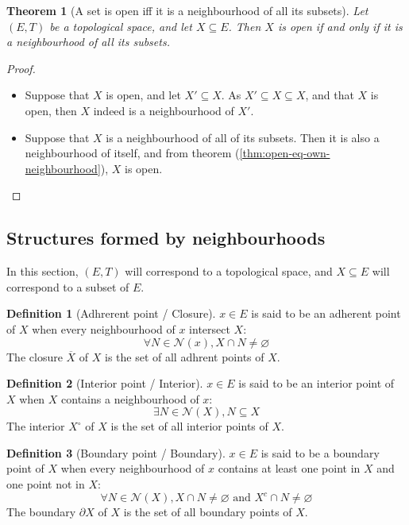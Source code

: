\documentclass{article}
\newtheorem{theorem}{Theorem}[section]
\theoremstyle{definition}
\newtheorem{definition}{Definition}[section]
\theoremstyle{remark}
\theoremstyle{example}
\theoremstyle{notation}
\newcommand{\inter}[1]{{{#1}^\circ}}
\newcommand{\tand}{\text{ and }}
\begin{document}
\begin{theorem}[A set is open iff it is a neighbourhood of all its subsets] \label{thm:open-eq-neighbourhood}
		Let $(E, T)$ be a topological space, and let $X \subseteq E$. Then $X$ is open if and only if it is a neighbourhood of all its subsets.
\end{theorem}

\begin{proof}~
	\begin{itemize}
		\item Suppose that $X$ is open, and let $X' \subseteq X$. As $X' \subseteq X \subseteq X$, and that $X$ is open, then $X$ indeed is a neighbourhood of $X'$.
		\item Suppose that $X$ is a neighbourhood of all of its subsets. Then it is also a neighbourhood of itself, and from theorem (\ref{thm:open-eq-own-neighbourhood}), $X$ is open.
	\end{itemize}
\end{proof}

\subsection{Structures formed by neighbourhoods}

In this section, $(E, T)$ will correspond to a topological space, and $X \subseteq E$ will correspond to a subset of $E$.

\begin{definition}[Adhrerent point / Closure]
		$x \in E$ is said to be an adherent point of $X$ when every neighbourhood of $x$ intersect $X$:
				$$\forall N \in \mathcal{N}(x), X \cap N \neq \varnothing$$
		The closure $\overline{X}$ of $X$ is the set of all adhrent points of $X$.
\end{definition}

\begin{definition}[Interior point / Interior]
		$x \in E$ is said to be an interior point of $X$ when $X$ contains a neighbourhood of $x$:
				$$\exists N \in \mathcal{N}(X), N \subseteq X$$
		The interior $\inter{X}$ of $X$ is the set of all interior points of $X$.
\end{definition}

\begin{definition}[Boundary point / Boundary]
		$x \in E$ is said to be a boundary point of $X$ when every neighbourhood of $x$ contains at least one point in $X$ and one point not in $X$:
				$$\forall N \in \mathcal{N}(X), X \cap N \neq \varnothing \tand X^c \cap N \neq \varnothing$$
		The boundary $\partial X$ of $X$ is the set of all boundary points of $X$.
\end{definition}
\end{document}
